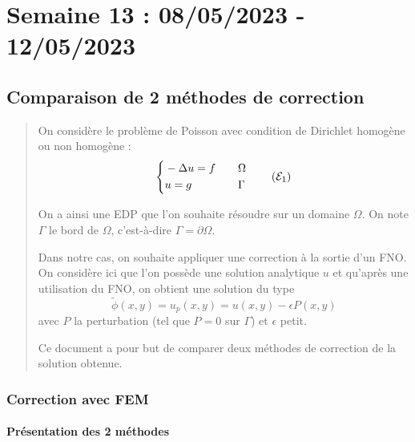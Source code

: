 \section{Semaine 13 : 08/05/2023 - 12/05/2023}
\graphicspath{{semaines/semaine_13/images/}}

\setcounter{equation}{0}
\setlength\parindent{0pt}

\subsection{Comparaison de 2 méthodes de correction \faBookmarkO}

\begin{abstract}
	On considère le problème de Poisson avec condition de Dirichlet homogène ou non homogène :
	\begin{equation}
		\label{pb1}
		\left\{\begin{aligned}
			&-\Delta u=f \quad &&\Omega \\
			&u=g \quad &&\Gamma
		\end{aligned}\right. \tag{$\mathcal{E}_1$}
	\end{equation}
	
	On a ainsi une EDP que l'on souhaite résoudre sur un domaine $\Omega$. On note $\Gamma$ le bord de $\Omega$, c'est-à-dire $\Gamma=\partial\Omega$. 
	
	Dans notre cas, on souhaite appliquer une correction à la sortie d'un FNO.
	On considère ici que l'on possède une solution analytique $u$ et qu'après une utilisation du FNO, on obtient une solution du type
	\begin{equation*}
		\label{phi_tild}
		\tilde{\phi}(x,y)=u_p(x,y) = u(x,y)-\epsilon P(x,y)
	\end{equation*}
	avec $P$ la perturbation (tel que $P=0$ sur $\Gamma$) et $\epsilon$ petit.
	
	Ce document a pour but de comparer deux méthodes de correction de la solution obtenue.
\end{abstract}

\subsubsection{Correction avec FEM}

\paragraph{Présentation des 2 méthodes}

